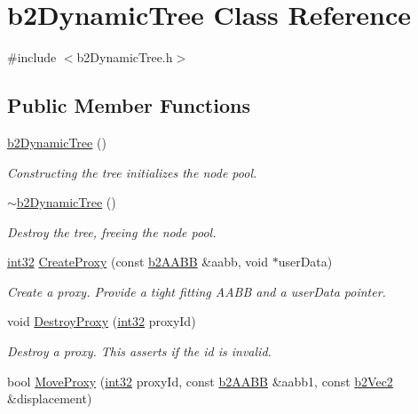 \hypertarget{classb2_dynamic_tree}{}\section{b2\+Dynamic\+Tree Class Reference}
\label{classb2_dynamic_tree}


{\ttfamily \#include $<$b2\+Dynamic\+Tree.\+h$>$}

\subsection*{Public Member Functions}
\begin{DoxyCompactItemize}
\item 
\mbox{\hyperlink{classb2_dynamic_tree_a8af64cf6a1566fa4c5b5c9683bd937d9}{b2\+Dynamic\+Tree}} ()
\begin{DoxyCompactList}\small\item\em Constructing the tree initializes the node pool. \end{DoxyCompactList}\item 
\mbox{\hyperlink{classb2_dynamic_tree_a9060565fc63b4dd87d9560775c076786}{$\sim$b2\+Dynamic\+Tree}} ()
\begin{DoxyCompactList}\small\item\em Destroy the tree, freeing the node pool. \end{DoxyCompactList}\item 
\mbox{\hyperlink{b2_settings_8h_a43d43196463bde49cb067f5c20ab8481}{int32}} \mbox{\hyperlink{classb2_dynamic_tree_ae44676f12977dada46037da47fc7ffbf}{Create\+Proxy}} (const \mbox{\hyperlink{structb2_a_a_b_b}{b2\+A\+A\+BB}} \&aabb, void $\ast$user\+Data)
\begin{DoxyCompactList}\small\item\em Create a proxy. Provide a tight fitting A\+A\+BB and a user\+Data pointer. \end{DoxyCompactList}\item 
void \mbox{\hyperlink{classb2_dynamic_tree_a62aa451e7d7fe029818dd05f76ea9cdc}{Destroy\+Proxy}} (\mbox{\hyperlink{b2_settings_8h_a43d43196463bde49cb067f5c20ab8481}{int32}} proxy\+Id)
\begin{DoxyCompactList}\small\item\em Destroy a proxy. This asserts if the id is invalid. \end{DoxyCompactList}\item 
bool \mbox{\hyperlink{classb2_dynamic_tree_a7748252811f3c575015931399cbe4daa}{Move\+Proxy}} (\mbox{\hyperlink{b2_settings_8h_a43d43196463bde49cb067f5c20ab8481}{int32}} proxy\+Id, const \mbox{\hyperlink{structb2_a_a_b_b}{b2\+A\+A\+BB}} \&aabb1, const \mbox{\hyperlink{structb2_vec2}{b2\+Vec2}} \&displacement)

\end{DoxyCompactItemize}
